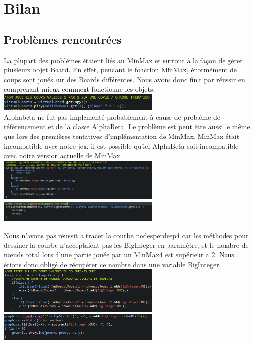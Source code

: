 \chapter{Bilan}

\section{Problèmes rencontrées}

\flushleft La plupart des problèmes étaient liés au MinMax et surtout à la façon de gérer plusieurs objet Board.
En effet, pendant le fonction MinMax, énormément de coups sont joués sur des Boards différentes.
Nous avons donc finit par réussir en comprenant mieux comment fonctionne les objets.
\\
\includegraphics[width=0.60\textwidth]{./VIRTUALBOARD}
\\
Alphabeta ne fut pas implémenté probablement à cause de problème de référencement et de la classe
AlphaBeta. Le problème est peut être aussi le même que lors des premières tentatives d'implémentation
de MinMax. MinMax était incompatible avec notre jeu, il est possible qu'ici AlphaBeta soit incompatible
avec notre version actuelle de MinMax.\\


\includegraphics[width=0.60\textwidth]{./ALPHABETA}
\includegraphics[width=0.60\textwidth]{./ALPHABETA2}

Nous n'avons pas réussit a tracer la courbe nodesperdeep4 car les méthodes pour dessiner la courbe
n'acceptaient pas les BigInteger en paramètre, et le nombre de nœuds total lors d'une partie
jouée par un MinMax4 est supérieur a 2. Nous étions donc obligé de récupérer ce nombre dans une
variable BigInteger.
\\
\includegraphics[width=0.60\textwidth]{./BIGINTEGER}
\includegraphics[width=0.60\textwidth]{./BIGINTEGER2}
\\

